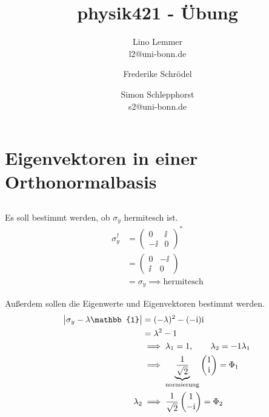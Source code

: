 

\setcounter{thezettel}{8}
\renewcommand\thesection{\arabic{thezettel}.\arabic{section}}

\newcommand{\ui}[1]{\int_{-\infty}^{\infty}\dif {#1}\;}
\newcommand\ccancel[2][black]{\renewcommand\CancelColor{\color{#1}}\cancel{#2}}


\title{physik421 - Übung }
\author{Lino Lemmer \\ \small{l2@uni-bonn.de} \and Frederike Schrödel \and Simon Schlepphorst\\ \small{s2@uni-bonn.de}}


\maketitle

\section{Eigenvektoren in einer Orthonormalbasis}
\subsection{}
Es soll bestimmt werden, ob $\sigma_y$ hermitesch ist.
\begin{align*}
    \sigma^\dagger_y &= 
    \begin{pmatrix}
        0 &\ii \\
        -\ii &0
    \end{pmatrix}^* \\
    &= \begin{pmatrix}
        0 &-\ii \\
        \ii &0
    \end{pmatrix} \\
    &= \sigma_y \implies \text{hermitesch}
\end{align*}

Außerdem sollen die Eigenwerte und Eigenvektoren bestimmt werden.
\begin{align*}
    \abs{\sigma_y-\lambda\mathbb{1}} &= (-\lambda)^2-(-\ii)\ii \\
                                    &= \lambda^2-1 \\
                                    &\implies \lambda_1 =1, \qquad \lambda_2 = -1
    \lambda_1 \\
    &\implies \underbrace{\frac{1}{\sqrt{2}}}_\text{normierung}\begin{pmatrix}
        1 \\ \ii
    \end{pmatrix} = \Phi_1\\
    \lambda_2 &\implies \frac 1{\sqrt 2}\begin{pmatrix}
        1 \\ -\ii
    \end{pmatrix} = \Phi_2
\end{align*}

